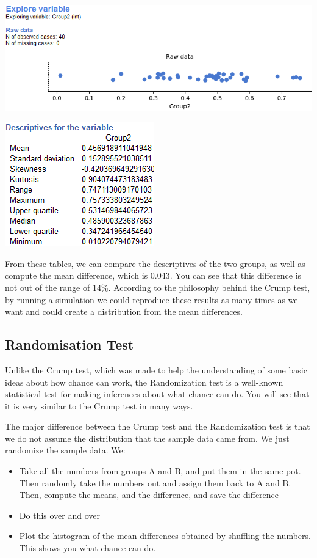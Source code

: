 \documentclass[
]{book}
\begin{document}
\includegraphics{img/ch5/5.3.4.1.5randExpvarrawG2.png}

\includegraphics{img/ch5/5.3.4.1.5descrG2.png}

From these tables, we can compare the descriptives of the two groups, as well as compute the mean difference, which is 0.043. You can see that this difference is not out of the range of 14\%. According to the philosophy behind the Crump test, by running a simulation we could reproduce these results as many times as we want and could create a distribution from the mean differences.

\hypertarget{randomisation-test}{%
\subsection{Randomisation Test}\label{randomisation-test}}

Unlike the Crump test, which was made to help the understanding of some basic ideas about how chance can work, the Randomization test is a well-known statistical test for making inferences about what chance can do. You will see that it is very similar to the Crump test in many ways.

The major difference between the Crump test and the Randomization test is that we do not assume the distribution that the sample data came from. We just randomize the sample data. We:

\begin{itemize}
\item
  Take all the numbers from groups A and B, and put them in the same pot. Then randomly take the numbers out and assign them back to A and B. Then, compute the means, and the difference, and save the difference
\item
  Do this over and over
\item
  Plot the histogram of the mean differences obtained by shuffling the numbers. This shows you what chance can do.
\end{itemize}
\end{document}
